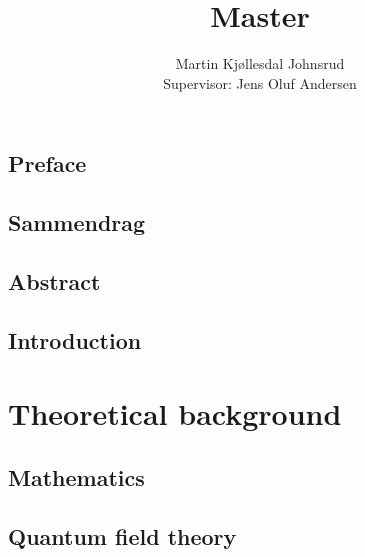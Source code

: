 \documentclass{book}
\title{\huge{Master}}
\author{
    \large{Martin Kjøllesdal Johnsrud}\\
    \normalsize{Supervisor: Jens Oluf Andersen}
    }
\begin{document}
    \frontmatter
    \maketitle

    \chapter{Preface}
    
    \chapter{Sammendrag}
    
    \chapter{Abstract}
    


    \listoftodos
    \clearpage
    \setcounter{tocdepth}{1}
    \tableofcontents
   
    \setlength{\parindent}{0em}
    \setlength{\parskip}{0.8em}

    \mainmatter

    \chapter{Introduction}
    \label{chapter: introduction}
    

    \part{Theoretical background}
    \label{part: theoretical background}

    \chapter{Mathematics}
    \label{chapter: math}
    
    

    \chapter{Quantum field theory}
    \label{chapter: QFT}
    
    
    
    
    
\end{document}
